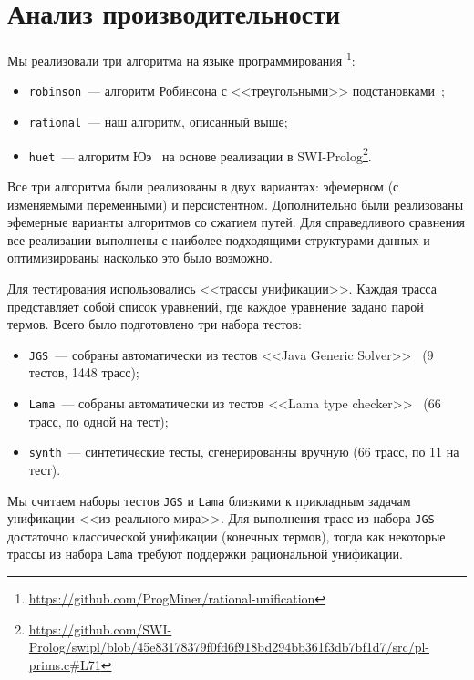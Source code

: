 \section{Анализ производительности}

Мы реализовали три алгоритма на языке программирования \OCaml\footnote{\url{https://github.com/ProgMiner/rational-unification}}:
\begin{itemize}
    \item \texttt{robinson}~--- алгоритм Робинсона с <<треугольными>> подстановками~\cite{baader2001unification};
    \item \texttt{rational}~--- наш алгоритм, описанный выше;
    \item \texttt{huet}~--- алгоритм Юэ~\cite{huet1976resolution} на основе реализации в SWI-Prolog\footnote{\url{https://github.com/SWI-Prolog/swipl/blob/45e83178379f0fd6f918bd294bb361f3db7bf1d7/src/pl-prims.c\#L71}}.
\end{itemize}

Все три алгоритма были реализованы в двух вариантах: эфемерном (с изменяемыми переменными) и персистентном. Дополнительно были реализованы эфемерные варианты алгоритмов со сжатием путей. Для справедливого сравнения все реализации выполнены с наиболее подходящими структурами данных и оптимизированы насколько это было возможно.

Для тестирования использовались <<трассы унификации>>. Каждая трасса представляет собой список уравнений, где каждое уравнение задано парой термов. Всего было подготовлено три набора тестов:
\begin{itemize}
    \item \texttt{JGS}~--- собраны автоматически из тестов <<Java Generic Solver>>~\cite{lozov2023relational} (9 тестов, 1448 трасс);
    \item \texttt{Lama}~--- собраны автоматически из тестов <<Lama type checker>>~\cite{domoratskiy2024relational} (66 трасс, по одной на тест);
    \item \texttt{synth}~--- синтетические тесты, сгенерированны вручную (66 трасс, по 11 на тест).
\end{itemize}

Мы считаем наборы тестов \texttt{JGS} и \texttt{Lama} близкими к прикладным задачам унификации <<из реального мира>>. Для выполнения трасс из набора \texttt{JGS} достаточно классической унификации (конечных термов), тогда как некоторые трассы из набора \texttt{Lama} требуют поддержки рациональной унификации.

